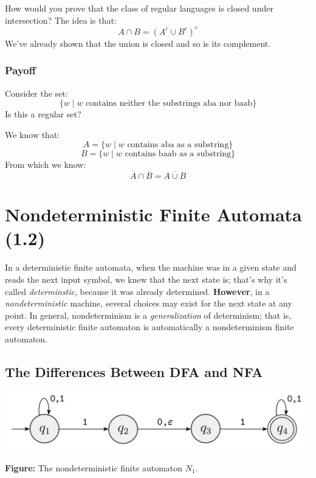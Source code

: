\documentclass[letterpaper]{article}
\begin{document}
\bigskip 

How would you prove that the class of regular languages is closed under intersection? The idea is that:
\[A \cap B = (A^c \cup B^c)^c\]
We've already shown that the union is closed and so is its complement. 

\subsubsection{Payoff}
Consider the set: 
\[
    \{w \mid w \text{ contains neither the substrings aba nor baab}\}  
\]
Is this a regular set? 

\begin{mdframed}[]
    We know that:
    \[A = \{w \mid w \text{ contains aba as a substring}\}\]
    \[B = \{w \mid w \text{ contains baab as a substring}\}\]
    From which we know: 
    \[\overline{A} \cap \overline{B} = \overline{A \cup B}\]
\end{mdframed}










\newpage 

\section{Nondeterministic Finite Automata (1.2)}
In a deterministic finite automata, when the machine was in a given state and reads the next input symbol, we knew that the next state is; that's why it's called \emph{determinstic}, because it was already determined. \textbf{However}, in a \emph{nondeterministic} machine, several choices may exist for the next state at any point. In general, nondeterminism is a \emph{generalization} of determinism; that is, every deterministic finite automaton is automatically a nondeterminism finite automaton.

\subsection{The Differences Between DFA and NFA}
\begin{center}
    \includegraphics[scale=0.4]{assets/nfa_1.png}
    
    \textbf{Figure:} The nondeterministic finite automaton $N_1$. 
\end{center}
\end{document}
